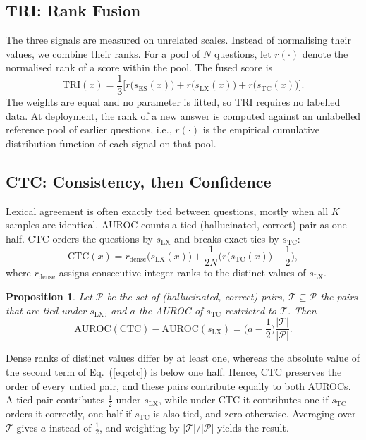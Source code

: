 \documentclass[conference]{IEEEtran}
\newtheorem{proposition}{Proposition}
\newcommand{\sES}{s_{\mathrm{ES}}}
\newcommand{\sLX}{s_{\mathrm{LX}}}
\newcommand{\sTC}{s_{\mathrm{TC}}}
\begin{document}
\subsection{TRI: Rank Fusion}
The three signals are measured on unrelated scales. Instead of normalising their values, we combine their ranks. For a pool of $N$ questions, let $r(\cdot)$ denote the normalised rank of a score within the pool. The fused score is
\begin{equation}
\mathrm{TRI}(x)=\frac13\Big[r\big(\sES(x)\big)+r\big(\sLX(x)\big)+r\big(\sTC(x)\big)\Big].
\label{eq:tri}
\end{equation}
The weights are equal and no parameter is fitted, so TRI requires no labelled data. At deployment, the rank of a new answer is computed against an unlabelled reference pool of earlier questions, i.e., $r(\cdot)$ is the empirical cumulative distribution function of each signal on that pool.

\subsection{CTC: Consistency, then Confidence}
Lexical agreement is often exactly tied between questions, mostly when all $K$ samples are identical. AUROC counts a tied (hallucinated, correct) pair as one half. CTC orders the questions by $\sLX$ and breaks exact ties by $\sTC$:
\begin{equation}
\mathrm{CTC}(x)=r_{\mathrm{dense}}\big(\sLX(x)\big)+\frac{1}{2N}\Big(r\big(\sTC(x)\big)-\frac12\Big),
\label{eq:ctc}
\end{equation}
where $r_{\mathrm{dense}}$ assigns consecutive integer ranks to the distinct values of $\sLX$.

\begin{proposition}\label{prop:ctc}
Let $\mathcal{P}$ be the set of (hallucinated, correct) pairs, $\mathcal{T}\subseteq\mathcal{P}$ the pairs that are tied under $\sLX$, and $a$ the AUROC of $\sTC$ restricted to $\mathcal{T}$. Then
\begin{equation}
\mathrm{AUROC}(\mathrm{CTC})-\mathrm{AUROC}(\sLX)=\Big(a-\frac12\Big)\frac{|\mathcal{T}|}{|\mathcal{P}|}.
\end{equation}
\end{proposition}
\begin{IEEEproof}
Dense ranks of distinct values differ by at least one, whereas the absolute value of the second term of Eq.~(\ref{eq:ctc}) is below one half. Hence, CTC preserves the order of every untied pair, and these pairs contribute equally to both AUROCs. A tied pair contributes $\frac12$ under $\sLX$, while under CTC it contributes one if $\sTC$ orders it correctly, one half if $\sTC$ is also tied, and zero otherwise. Averaging over $\mathcal{T}$ gives $a$ instead of $\frac12$, and weighting by $|\mathcal{T}|/|\mathcal{P}|$ yields the result.
\end{IEEEproof}
\end{document}
